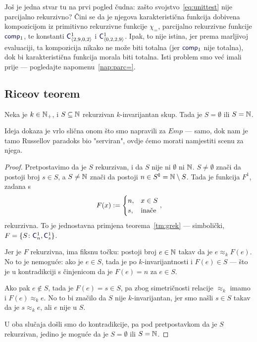Još je jedna stvar tu na prvi pogled čudna: zašto svojstvo~\eqref{eq:unittest} nije parcijalno rekurzivno? Čini se da je njegova karakteristična funkcija dobivena kompozicijom iz primitivno rekurzivne funkcije $\chi_=$, parcijalno rekurzivne funkcije $\f{comp}_1$, te konstanti $\f C^1_{\kr{2,9,0,2}}$ i $\f C^1_{\kr{0,2,2,9}}$. Ipak, to nije istina, jer prema marljivoj evaluaciji, ta kompozicija nikako ne može biti totalna (jer $\f{comp}_1$ nije totalna), dok bi karakteristična funkcija morala biti totalna. Isti problem smo već imali prije --- pogledajte napomenu~\ref{nap:parc=}.

\subsection{Riceov teorem}

\begin{teorem}\label{tm:Rice}
Neka je $k\in{\mathbb N}_+$, i $S\subseteq{\mathbb N}$ rekurzivan $k$-invarijantan skup. Tada je $S=\emptyset$ ili $S={\mathbb N}$.
\end{teorem}

Ideja dokaza je vrlo slična onom što smo napravili za $Emp$ --- samo, dok nam je tamo Russellov paradoks bio "serviran"\!, ovdje ćemo morati namjestiti scenu za njega.

\begin{proof}
Pretpostavimo da je $S$ rekurzivan, i da $S$ nije ni $\emptyset$ ni ${\mathbb N}$. $S\not=\emptyset$ znači da postoji broj $s\in S$, a $S\not={\mathbb N}$ znači da postoji $n\in S\sp{{\scriptscriptstyle\complement}}={\mathbb N}\setminus S$. Tada je funkcija $F^1$, zadana s
\begin{equation}
    F(x):=\begin{cases}
        n,&x\in S\\
        s,&\text{inače}
    \end{cases}\text,
\end{equation}
rekurzivna. To je jednostavna primjena teorema~\ref{tm:grek} --- simbolički, $F=\{S\colon\f C_n^1,\f C_s^1\}$.

Jer je $F$ rekurzivna, ima fiksnu točku: postoji broj $e\in{\mathbb N}$ takav da je $e\approx_k F(e)$. No to je nemoguće: ako je $e\in S$, tada je po $k$-invarijantnosti i $F(e)\in S$ --- što je u kontradikciji s činjenicom da je $F(e)=n$ za $e\in S$.

Ako pak $e\not\in S$, tada je $F(e)=s\in S$, pa zbog simetričnosti relacije $\approx_k$ imamo i $F(e)\approx_k e$. No to bi značilo da $S$ nije $k$-invarijantan, jer smo našli $s\in S$ takav da je $s\approx_k e$, ali $e$ nije u $S$.

U oba slučaja došli smo do kontradikcije, pa pod pretpostavkom da je $S$ rekurzivan, jedino je moguće da je $S=\emptyset$ ili $S={\mathbb N}$.
\end{proof}

